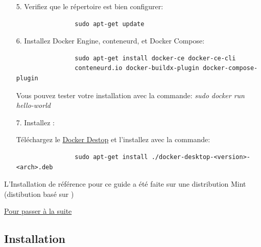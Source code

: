 \begin{itemize}
        \item[5.] Verifiez que le répertoire est bien configurer:

            \begin{lstlisting}
                sudo apt-get update
            \end{lstlisting}    

        \item[6.] Installez Docker Engine, conteneurd, et Docker Compose:

            \begin{lstlisting}
                sudo apt-get install docker-ce docker-ce-cli 
                conteneurd.io docker-buildx-plugin docker-compose-plugin
            \end{lstlisting}
            \begin{footnotesize}
                Vous pouvez tester votre installation avec la commande: \textit{sudo docker run hello-world}
            \end{footnotesize}

            \bigskip
        \item[7.] Installez \dockerdesktop{}:

        
            \begin{footnotesize}
                Téléchargez le \href{https://desktop.docker.com/linux/main/amd64/docker-desktop-4.17.0-amd64.deb?utm_source=docker&utm_medium=webreferral&utm_campaign=docs-driven-download-linux-amd64}{Docker Destop} et l'installez avec la commande:
            \end{footnotesize}

            \begin{lstlisting}
                sudo apt-get install ./docker-desktop-<version>-<arch>.deb
            \end{lstlisting}

    \end{itemize}

    \bigskip

    \begin{footnotesize}
        L'Installation de référence pour ce guide a été faite sur une distribution \linux{} Mint (distibution basé sur \ubuntu{})\\
    \end{footnotesize}

    \hyperref[sec:suite_installation]{Pour passer à la suite}

\newpage

\subsection[Installation Windows]{Installation \windows{}\label{sec:installation_windows}}

